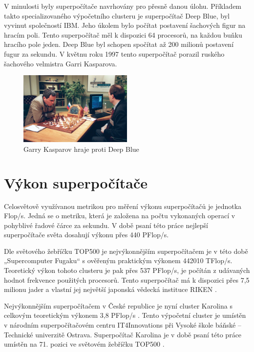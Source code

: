 V minulosti byly superpočítače navrhovány pro přesně danou úlohu. Příkladem takto specializovaného výpočetního clusteru je superpočítač Deep Blue, byl vyvinut společností IBM. Jeho úkolem bylo počítat postavení šachových figur na hracím poli. Tento superpočítač měl k dispozici 64 procesorů, na každou buňku hracího pole jeden. Deep Blue byl schopen spočítat až 200 milionů postavení fugur za sekundu. V květnu roku 1997 tento superpočítač porazil ruského šachového velmistra Garri Kasparova.\cite{Hosch20191128}

\begin{figure}[h]
	\centering
	\includegraphics[width=0.5\textwidth]{Figures/Garry-Kasparov-playing-against-Deep-Blue.jpeg}
	\caption{Garry Kasparov hraje proti Deep Blue \cite{Hosch20191128}}
	\label{fig:garry-kasparov}
\end{figure}

\section{Výkon superpočítače}
Celosvětově využívanou metrikou pro měření výkonu superpočítačů je jednotka Flop/s. Jedná se o metriku, která je založena na počtu vykonaných operací v pohyblivé řadové čárce za sekundu. V době psaní této práce nejlepší superpočítače světa dosahují výkonu přes 440 PFlop/s.

Dle světového žebříčku TOP500 je nejvýkonnějším superpočítačem je v této době 
„Supercomputer Fugaku“ s ověřeným praktickým výkonem 442010 TFlop/s. Teoretický výkon tohoto clusteru je pak přes 537 PFlop/s, je počítán z udávaných hodnot frekvence použitých procesorů. Tento superpočítač má k dispozici přes 7,5 milionu jader a vlastní jej největší japonská vědecká instituce RIKEN \cite{B2TvJy8L3mSIxfWp}.

Nejvýkonnějším superpočítačem v České republice je nyní cluster Karolina s celkovým teoretickým výkonem 3,8 PFlop/s \cite{oviOzaWRPKlKSq7K}. Tento výpočetní cluster je umístěn v národním superpočítačovém centru IT4Innovations při Vysoké škole báňské – Technické univerzitě Ostrava. Superpočítač Karolina je v době psaní této práce umístěn na 71. pozici ve světovém žebříčku TOP500 \cite{iqgLoV1cXM0Qb6t1}.

